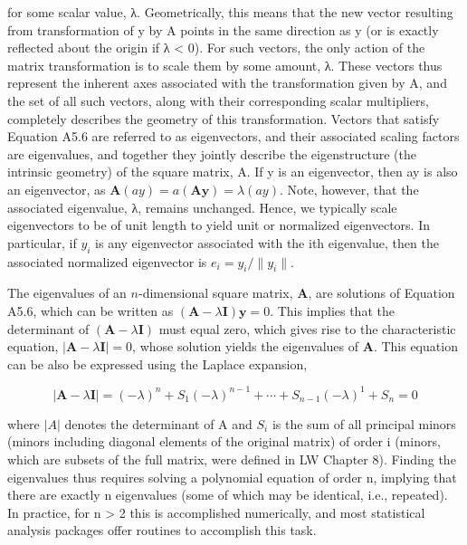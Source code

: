 \documentclass{article}
\begin{document}
for some scalar value, λ. Geometrically, this means that the new vector resulting from transformation of y by A points in the same direction as y (or is exactly reflected about the origin if λ < 0). For such vectors, the only action of the matrix transformation is to scale them by some amount, λ. These vectors thus represent the inherent axes associated with the transformation given by A, and the set of all such vectors, along with their corresponding scalar multipliers, completely describes the geometry of this transformation. Vectors that satisfy Equation A5.6 are referred to as eigenvectors, and their associated scaling factors are eigenvalues, and together they jointly describe the eigenstructure (the intrinsic geometry) of the square matrix, A. If y is an eigenvector, then ay is also an eigenvector, as  $ \mathbf{A}(ay) = a(\mathbf{Ay}) = \lambda(ay) $. Note, however, that the associated eigenvalue, λ, remains unchanged. Hence, we typically scale eigenvectors to be of unit length to yield unit or normalized eigenvectors. In particular, if  $ y_i $ is any eigenvector associated with the ith eigenvalue, then the associated normalized eigenvector is  $ e_i = y_i / \|y_i\| $.

The eigenvalues of an $n$-dimensional square matrix, $\mathbf{A}$, are solutions of Equation A5.6, which can be written as $(\mathbf{A} - \lambda \mathbf{I}) \mathbf{y} = 0$. This implies that the determinant of $(\mathbf{A} - \lambda \mathbf{I})$ must equal zero, which gives rise to the characteristic equation, $|\mathbf{A} - \lambda \mathbf{I}| = 0$, whose solution yields the eigenvalues of $\mathbf{A}$. This equation can be also be expressed using the Laplace expansion,

\begin{equation}
\left|\mathbf{A}-\lambda\mathbf{I}\right|=(-\lambda)^{n}+S_{1}(-\lambda)^{n-1}+\cdots+S_{n-1}(-\lambda)^{1}+S_{n}=0
\end{equation}

where  $ |A| $ denotes the determinant of A and  $ S_i $ is the sum of all principal minors (minors including diagonal elements of the original matrix) of order i (minors, which are subsets of the full matrix, were defined in LW Chapter 8). Finding the eigenvalues thus requires solving a polynomial equation of order n, implying that there are exactly n eigenvalues (some of which may be identical, i.e., repeated). In practice, for n > 2 this is accomplished numerically, and most statistical analysis packages offer routines to accomplish this task.
\end{document}
